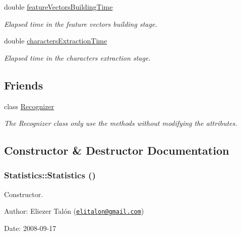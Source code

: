 \begin{CompactItemize}
double \hyperlink{class_statistics_ae46d5f7b2a374dd79b15533facc9e6c}{featureVectorsBuildingTime}
\begin{CompactList}\small\item\em Elapsed time in the feature vectors building stage. \item\end{CompactList}\item 
double \hyperlink{class_statistics_1e09de36cf3a65ab2a471e877578257d}{charactersExtractionTime}
\begin{CompactList}\small\item\em Elapsed time in the characters extraction stage. \item\end{CompactList}\end{CompactItemize}
\subsection*{Friends}
\begin{CompactItemize}
\item 
\hypertarget{class_statistics_11123fa51c07995419270030024a7dfe}{
class \hyperlink{class_statistics_11123fa51c07995419270030024a7dfe}{Recognizer}}
\label{class_statistics_11123fa51c07995419270030024a7dfe}

\begin{CompactList}\small\item\em The Recognizer class only use the methods without modifying the attributes. \item\end{CompactList}\end{CompactItemize}


\subsection{Constructor \& Destructor Documentation}
\hypertarget{class_statistics_60ddd90a571ed4c3ce8c0f6317a36d63}{
\subsubsection[Statistics]{\setlength{\rightskip}{0pt plus 5cm}Statistics::Statistics ()}}
\label{class_statistics_60ddd90a571ed4c3ce8c0f6317a36d63}


Constructor. 

\begin{Desc}
\item[Author:]Eliezer Talón (\href{mailto:elitalon@gmail.com}{\tt elitalon@gmail.com}) \end{Desc}
\begin{Desc}
\item[Date:]2008-09-17 \end{Desc}


